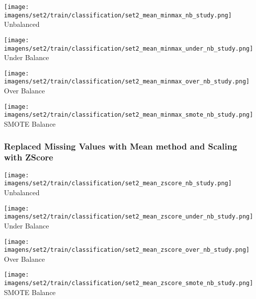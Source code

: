 \documentclass[11pt]{article}
\begin{document}
\begin{figure*}[!htp]
    \begin{minipage}[!htp]{.25\textwidth}
        \centering
        \texttt{[image: imagens/set2/train/classification/set2\_mean\_minmax\_nb\_study.png]}
        Unbalanced
    \end{minipage}\hfill
    \begin{minipage}[!htp]{.25\textwidth}
        \centering
        \texttt{[image: imagens/set2/train/classification/set2\_mean\_minmax\_under\_nb\_study.png]}
        Under Balance
    \end{minipage}\hfill
    \begin{minipage}[!htp]{.25\textwidth}
        \centering
        \texttt{[image: imagens/set2/train/classification/set2\_mean\_minmax\_over\_nb\_study.png]}
        Over Balance
    \end{minipage}\hfill
    \begin{minipage}[!htp]{.25\textwidth}
        \centering
        \texttt{[image: imagens/set2/train/classification/set2\_mean\_minmax\_smote\_nb\_study.png]}
        SMOTE Balance
    \end{minipage}
\end{figure*}

\subsubsection*{Replaced Missing Values with Mean method and Scaling with ZScore}

\begin{figure*}[!htp]
    \begin{minipage}[!htp]{.25\textwidth}
        \centering
        \texttt{[image: imagens/set2/train/classification/set2\_mean\_zscore\_nb\_study.png]}
        Unbalanced
    \end{minipage}\hfill
    \begin{minipage}[!htp]{.25\textwidth}
        \centering
        \texttt{[image: imagens/set2/train/classification/set2\_mean\_zscore\_under\_nb\_study.png]}
        Under Balance
    \end{minipage}\hfill
    \begin{minipage}[!htp]{.25\textwidth}
        \centering
        \texttt{[image: imagens/set2/train/classification/set2\_mean\_zscore\_over\_nb\_study.png]}
        Over Balance
    \end{minipage}\hfill
    \begin{minipage}[!htp]{.25\textwidth}
        \centering
        \texttt{[image: imagens/set2/train/classification/set2\_mean\_zscore\_smote\_nb\_study.png]}
        SMOTE Balance
    \end{minipage}
\end{figure*}
\end{document}
